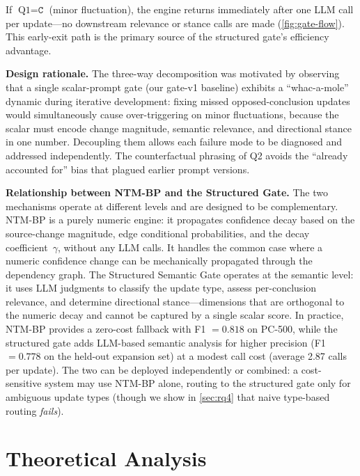 \documentclass{article}
\theoremstyle{definition}
\begin{document}
If $\text{Q1}=\texttt{C}$ (minor fluctuation), the engine returns
immediately after one LLM call per update---no downstream relevance or
stance calls are made (\cref{fig:gate-flow}).  This early-exit path is
the primary source of the structured gate's efficiency advantage.

\textbf{Design rationale.}  The three-way decomposition was motivated
by observing that a single scalar-prompt gate (our gate-v1 baseline)
exhibits a ``whac-a-mole'' dynamic during iterative development:
fixing missed opposed-conclusion updates would simultaneously cause
over-triggering on minor fluctuations, because the scalar must encode
change magnitude, semantic relevance, and directional stance in one
number.  Decoupling them allows each failure mode to be diagnosed and
addressed independently.  The counterfactual phrasing of Q2 avoids the
``already accounted for'' bias that plagued earlier prompt versions.

\textbf{Relationship between NTM-BP and the Structured Gate.}
The two mechanisms operate at different levels and are designed to be
complementary.  NTM-BP is a purely numeric engine: it propagates
confidence decay based on the source-change magnitude, edge conditional
probabilities, and the decay coefficient~$\gamma$, without any LLM
calls.  It handles the common case where a numeric confidence change
can be mechanically propagated through the dependency graph.  The
Structured Semantic Gate operates at the semantic level: it uses LLM
judgments to classify the update type, assess per-conclusion relevance,
and determine directional stance---dimensions that are orthogonal to
the numeric decay and cannot be captured by a single scalar score.
In practice, NTM-BP provides a zero-cost fallback with
F1 $=0.818$ on PC-500, while the structured gate adds
LLM-based semantic analysis for higher precision (F1 $=0.778$ on the
held-out expansion set) at a modest call cost (average 2.87 calls per
update).  The two can be deployed independently or combined: a
cost-sensitive system may use NTM-BP alone, routing to the structured
gate only for ambiguous update types (though we show in
\cref{sec:rq4} that naive type-based routing \emph{fails}).

\section{Theoretical Analysis}
\label{sec:theory}
\end{document}
